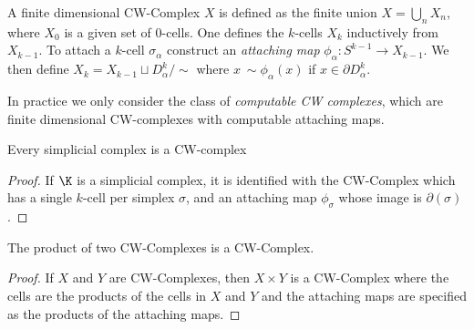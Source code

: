 \begin{definition}[CW-Complex]
 A finite dimensional CW-Complex $X$ is defined as the finite union $X = \bigcup_n X_n$, where $X_0$ is a given set of $0$-cells. One defines the $k$-cells $X_k$ inductively from $X_{k-1}$. To attach a $k$-cell $\sigma_\alpha$ construct an \emph{attaching map} $\phi_\alpha: S^{k-1} \rightarrow X_{k-1}$. We then define $X_k = X_{k-1} \sqcup D^k_\alpha / \sim$ where $x ~\sim \phi_\alpha(x)$ if $x \in \partial D^k_\alpha$. 
\end{definition}
In practice we only consider the class of  \emph{computable CW complexes}, which are finite dimensional CW-complexes with computable attaching maps.
\begin{lemma}
Every simplicial complex is a CW-complex
\label{lem:simp-is-cw}
\end{lemma}
\begin{proof}
If $\K$ is a simplicial complex, it is identified with the CW-Complex which has a single $k$-cell per simplex $\sigma$, and an attaching map $\phi_\sigma$ whose image is $\partial(\sigma)$.  
\end{proof}
\begin{lemma}
The product of two CW-Complexes is a CW-Complex.
\label{lem:cw-complex-product}
\end{lemma}
\begin{proof}
If $X$ and $Y$ are CW-Complexes, then $X \times Y$ is a CW-Complex where the cells are the products of the cells in $X$ and $Y$ and the attaching maps are specified as the products of the attaching maps.
\end{proof}


